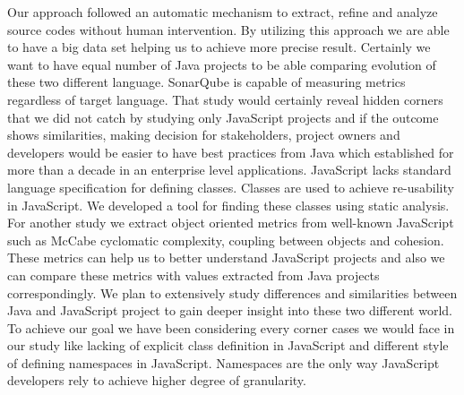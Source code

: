 Our approach followed an automatic mechanism to extract, refine and analyze source codes without human intervention. By utilizing this approach we are able to have a big data set helping us to achieve more precise result. Certainly we want to have equal number of Java projects to be able comparing evolution of these two different language. SonarQube is capable of measuring metrics regardless of target language. That study would certainly reveal hidden corners that we did not catch by studying only JavaScript projects and if the outcome shows similarities, making decision for stakeholders, project owners and developers would be easier to have best practices from Java which established for more than a decade in an enterprise level applications.
JavaScript lacks standard language specification for defining classes. Classes are used to achieve re-usability in JavaScript. We developed a tool for finding these classes using static analysis. For another study we extract object oriented metrics from well-known JavaScript such as McCabe cyclomatic complexity, coupling between objects \cite{Briand-Coupling} and cohesion\cite{Briand-Cohesion}. These metrics can help us to better understand JavaScript projects and also we can compare these metrics with values extracted from Java projects correspondingly. 
We plan to extensively study differences and similarities between Java and JavaScript project to gain deeper insight into these two different world. To achieve our goal we have been considering every corner cases we would face in our study like lacking of explicit class definition in JavaScript and different style of defining namespaces in JavaScript. Namespaces are the only way JavaScript developers rely to achieve higher degree of granularity.